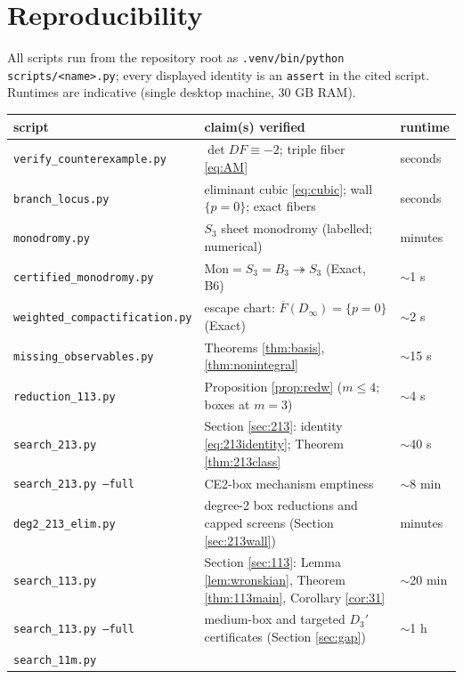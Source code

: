\documentclass[11pt]{article}
\theoremstyle{definition}
\theoremstyle{remark}
\begin{document}
\section{Reproducibility}\label{sec:repro}

All scripts run from the repository root as
\texttt{.venv/bin/python scripts/<name>.py}; every displayed identity
is an \texttt{assert} in the cited script. Runtimes are indicative
(single desktop machine, 30 GB RAM).

\begin{center}
\small
\begin{tabular}{l p{6.4cm} l}
\hline
script & claim(s) verified & runtime \\
\hline
\texttt{verify\_counterexample.py} &
 $\det DF \equiv -2$; triple fiber \eqref{eq:AM} & seconds \\
\texttt{branch\_locus.py} &
 eliminant cubic \eqref{eq:cubic}; wall $\{p=0\}$; exact fibers &
 seconds \\
\texttt{monodromy.py} &
 $S_3$ sheet monodromy (labelled; numerical) & minutes \\
\texttt{certified\_monodromy.py} &
 $\mathrm{Mon}=S_3=B_3\twoheadrightarrow S_3$ (Exact, B6) &
 $\sim$1 s \\
\texttt{weighted\_compactification.py} &
 escape chart: $\overline{F}(D_\infty)=\{p=0\}$ (Exact) &
 $\sim$2 s \\
\texttt{missing\_observables.py} &
 Theorems \ref{thm:basis}, \ref{thm:nonintegral} & $\sim$15 s \\
\texttt{reduction\_113.py} &
 Proposition \ref{prop:redw} ($m \le 4$; boxes at $m=3$) & $\sim$4 s \\
\texttt{search\_213.py} &
 Section \ref{sec:213}: identity \eqref{eq:213identity}; Theorem
 \ref{thm:213class} & $\sim$40 s \\
\texttt{search\_213.py --full} &
 CE2-box mechanism emptiness & $\sim$8 min \\
\texttt{deg2\_213\_elim.py} &
 degree-2 box reductions and capped screens (Section
 \ref{sec:213wall}) & minutes \\
\texttt{search\_113.py} &
 Section \ref{sec:113}: Lemma \ref{lem:wronskian}, Theorem
 \ref{thm:113main}, Corollary \ref{cor:31} & $\sim$20 min \\
\texttt{search\_113.py --full} &
 medium-box and targeted $D_3'$ certificates (Section \ref{sec:gap}) &
 $\sim$1 h \\
\texttt{search\_11m.py} &

\end{tabular}
\end{center}
\end{document}
